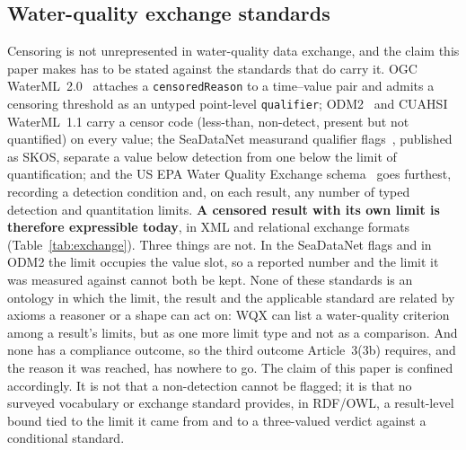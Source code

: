 \subsection{Water-quality exchange standards}
\label{sec:related-exchange}
Censoring is not unrepresented in water-quality data exchange, and the claim
this paper makes has to be stated against the standards that do carry it. OGC
WaterML~2.0~\cite{ogc2014waterml2} attaches a \texttt{censoredReason} to a
time--value pair and admits a censoring threshold as an untyped point-level
\texttt{qualifier}; ODM2~\cite{horsburgh2016odm2} and CUAHSI WaterML~1.1 carry a
censor code (less-than, non-detect, present but not quantified) on every value;
the SeaDataNet measurand qualifier flags~\cite{nerc_l20}, published as SKOS,
separate a value below detection from one below the limit of quantification;
and the US EPA Water Quality Exchange schema~\cite{epa_wqx3} goes furthest,
recording a detection condition and, on each result, any number of typed
detection and quantitation limits. \textbf{A censored result with its own limit
is therefore expressible today}, in XML and relational exchange formats
(Table~\ref{tab:exchange}). Three
things are not. In the SeaDataNet flags and in ODM2 the limit occupies the value
slot, so a reported number and the limit it was measured against cannot both be
kept. None of these standards is an ontology in which the limit, the result and
the applicable standard are related by axioms a reasoner or a shape can act on:
WQX can list a water-quality criterion among a result's limits, but as one more
limit type and not as a comparison. And none has a compliance outcome, so the
third outcome Article~3(3b) requires, and the reason it was reached, has nowhere
to go. The claim of this paper is confined accordingly. It is not that a
non-detection cannot be flagged; it is that no surveyed vocabulary or exchange
standard provides, in RDF/OWL, a result-level bound tied to the limit it came
from and to a three-valued verdict against a conditional standard.

